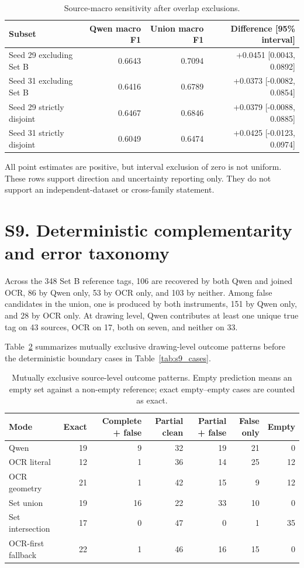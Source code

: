 \documentclass[11pt]{article}
\begin{document}
\begin{table}[H]
\centering
\caption{Source-macro sensitivity after overlap exclusions.}
\label{tab:s8_macro}
\small
\begin{tabular}{lrrr}
\toprule
Subset & Qwen macro F1 & Union macro F1 & Difference [95\% interval] \\
\midrule
Seed 29 excluding Set B & 0.6643 & 0.7094 & +0.0451 [0.0043, 0.0892] \\
Seed 31 excluding Set B & 0.6416 & 0.6789 & +0.0373 [-0.0082, 0.0854] \\
Seed 29 strictly disjoint & 0.6467 & 0.6846 & +0.0379 [-0.0088, 0.0885] \\
Seed 31 strictly disjoint & 0.6049 & 0.6474 & +0.0425 [-0.0123, 0.0974] \\
\bottomrule
\end{tabular}
\end{table}

All point estimates are positive, but interval exclusion of zero is not
uniform. These rows support direction and uncertainty reporting only. They do
not support an independent-dataset or cross-family statement.

\section*{S9. Deterministic complementarity and error taxonomy}

Across the 348 Set B reference tags, 106 are recovered by both Qwen and joined
OCR, 86 by Qwen only, 53 by OCR only, and 103 by neither. Among false
candidates in the union, one is produced by both instruments, 151 by Qwen
only, and 28 by OCR only. At drawing level, Qwen contributes at least one
unique true tag on 43 sources, OCR on 17, both on seven, and neither on 33.

Table~\ref{tab:s9_patterns} summarizes mutually exclusive drawing-level outcome
patterns before the deterministic boundary cases in Table~\ref{tab:s9_cases}.

\begin{table}[H]
\centering
\caption{Mutually exclusive source-level outcome patterns. Empty prediction
means an empty set against a non-empty reference; exact empty--empty cases are
counted as exact.}
\label{tab:s9_patterns}
\scriptsize
\begin{tabular}{lrrrrrr}
\toprule
Mode & Exact & Complete + false & Partial clean & Partial + false & False only & Empty \\
\midrule
Qwen & 19 & 9 & 32 & 19 & 21 & 0 \\
OCR literal & 12 & 1 & 36 & 14 & 25 & 12 \\
OCR geometry & 21 & 1 & 42 & 15 & 9 & 12 \\
Set union & 19 & 16 & 22 & 33 & 10 & 0 \\
Set intersection & 17 & 0 & 47 & 0 & 1 & 35 \\
OCR-first fallback & 22 & 1 & 46 & 16 & 15 & 0 \\
\bottomrule
\end{tabular}
\end{table}
\end{document}
